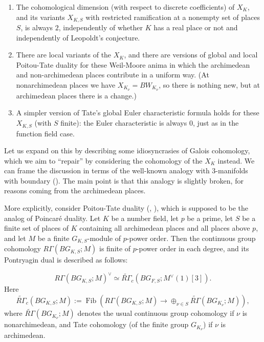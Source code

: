 \documentclass[12pt]{article}
\theoremstyle{definition}
\newcommand{\on}{\operatorname}
\begin{document}
\begin{enumerate}
\item The cohomological dimension  (with respect to discrete coefficients) of $X_K$, and its variants $X_{K,S}$ with restricted ramification at a nonempty set of places $S$, is always $2$, independently of whether $K$ has a real place or not and independently of Leopoldt's conjecture.
\item There are local variants of the $X_K$, and there are versions of global and local Poitou-Tate duality for these Weil-Moore anima in which the archimedean and non-archimedean places contribute in a uniform way. (At nonarchimedean places we have $X_{K_\nu}=BW_{K_\nu}$, so there is nothing new, but at archimedean places there is a change.)
\item A simpler version of Tate's global Euler characteristic formula holds for these $X_{K,S}$ (with $S$ finite): the Euler characteristic is always $0$, just as in the function field case.
\end{enumerate}

Let us expand on this by describing some idiosyncrasies of Galois cohomology, which we aim to ``repair'' by considering the cohomology of the $X_K$ instead.  We can frame the discussion in terms of the well-known analogy with 3-manifolds with boundary (\cite{morishita}). The main point is that this analogy is slightly broken, for reasons coming from the archimedean places.

More explicitly, consider Poitou-Tate duality (\cite{tateduality}, \cite{milneduality}), which is supposed to be the analog of Poincar\'{e} duality.  Let $K$ be a number field, let $p$ be a prime, let $S$ be a finite set of places of $K$ containing all archimedean places and all places above $p$, and let $M$ be a finite $G_{K,S}$-module of $p$-power order.  Then the continuous group cohomology $R\Gamma(BG_{K,S};M)$ is finite of $p$-power order in each degree, and its Pontryagin dual is described as follows:

$$R\Gamma(BG_{K,S};M)^\vee\simeq \widetilde{R\Gamma}_c(BG_{F,S};M^\vee(1)[3]).$$
Here
$$\widetilde{R\Gamma}_c(BG_{K,S};M) := \on{Fib}\left(R\Gamma(BG_{K,S};M)\to \oplus_{\nu\in S} \widetilde{R\Gamma}(BG_{K_\nu};M)\right),$$
where $\widetilde{R\Gamma}(BG_{K_\nu};M)$ denotes the usual continuous group cohomology if $\nu$ is nonarchimedean, and Tate cohomology (of the finite group $G_{K_\nu}$) if $\nu$ is archimedean.
\end{document}
